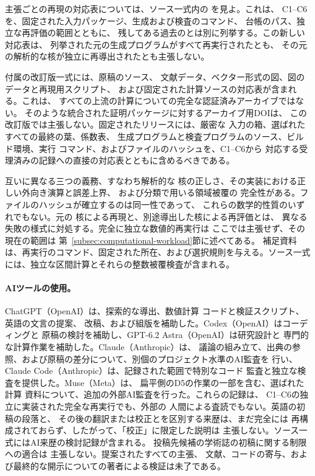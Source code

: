 主張ごとの再現の対応表については、ソース一式内の
を見よ。これは、
C1--C6を、固定された入力パッケージ、生成および検査のコマンド、
台帳のパス、独立な再評価の範囲とともに、
残してある過去のとは別に列挙する。この新しい対応表は、
列挙された元の生成プログラムがすべて再実行されたとも、
その元の解析的な核が独立に再導出されたとも主張しない。

付属の改訂版一式には、原稿のソース、
文献データ、ベクター形式の図、図のデータと再現用スクリプト、
および固定された計算ソースの対応表が含まれる。これは、
すべての上流の計算についての完全な認証済みアーカイブではない。
そのような統合された証明パッケージに対するアーカイブ用DOIは、
この改訂版では主張しない。固定されたリリースには、厳密な
入力の箱、選ばれたすべての最終の葉、係数表、
生成プログラムと検査プログラムのソース、ビルド環境、実行
コマンド、およびファイルのハッシュを、C1--C6から
対応する受理済みの記録への直接の対応表とともに含めるべきである。

互いに異なる三つの義務、すなわち解析的な
核の正しさ、その実装における正しい外向き演算と誤差上界、
および分類で用いる領域被覆の
完全性がある。ファイルのハッシュが確立するのは同一性であって、
これらの数学的性質のいずれでもない。元の
核による再現と、別途導出した核による再評価とは、
異なる失敗の様式に対処する。完全に独立な数値的再実行は
ここでは主張せず、その現在の範囲は
第~\ref{subsec:computational-workload}節に述べてある。
補足資料は、再実行のコマンド、固定された所在、および選択規則を与える。ソース一式には、独立な区間計算とそれらの整数被覆検査が含まれる。

\paragraph{AIツールの使用。}
ChatGPT（OpenAI）は、探索的な導出、数値計算
コードと検証スクリプト、英語の文言の提案、
改稿、および組版を補助した。Codex（OpenAI）はコーディングと
原稿の検討を補助し、GPT-6.2 Astra（OpenAI）は研究設計と
専門的な計算作業を補助した。Claude（Anthropic）は、
議論の組み立て、出典の参照、および原稿の差分について、別個のプロジェクト水準のAI監査を
行い、Claude Code（Anthropic）は、記録された範囲で特別なコード
監査と独立な検査を提供した。Muse（Meta）は、
扁平側のD5の作業の一部を含む、選ばれた計算
資料について、追加の外部AI監査を行った。これらの記録は、
C1--C6の独立に実装された完全な再実行でも、外部の
人間による査読でもない。英語の初稿の段落と、
その後の翻訳または校正とを区別する来歴は、まだ完全には
再構成されておらず、したがって、「校正」に限定した説明は
主張しない。ソース一式にはAI来歴の検討記録が含まれる。
投稿先候補の学術誌の初稿に関する制限への適合は
主張しない。提案されたすべての主張、
文献、コードの寄与、および最終的な開示についての著者による検証は未了である。
